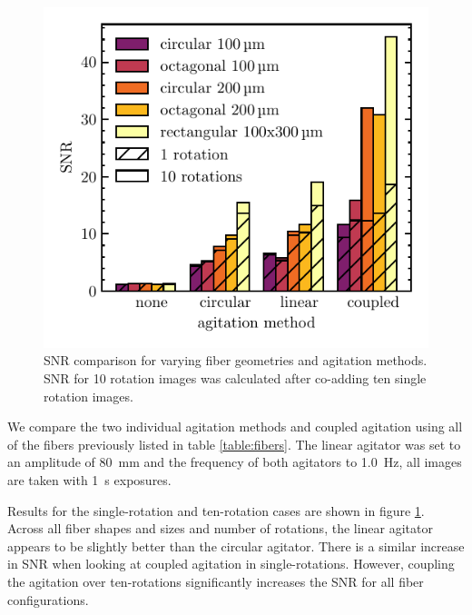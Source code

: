 \documentclass[twocolumn]{emulateapj}
\begin{document}
\begin{figure}
\centering
	\includegraphics[width=\columnwidth]{images/ag_snr.pdf}
	\caption{SNR comparison for varying fiber geometries and agitation methods. SNR for 10 rotation images was calculated after co-adding ten single rotation images.}
\label{fig:ag_snr}
\end{figure}

We compare the two individual agitation methods and coupled agitation using all of the fibers previously listed in table \ref{table:fibers}. The linear agitator was set to an amplitude of \SI{80}{\milli\meter} and the frequency of both agitators to \SI{1.0}{\hertz}, all images are taken with \SI{1}{\second} exposures.

Results for the single-rotation and ten-rotation cases are shown in figure \ref{fig:ag_snr}. Across all fiber shapes and sizes and number of rotations, the linear agitator appears to be slightly better than the circular agitator. There is a similar increase in SNR when looking at coupled agitation in single-rotations. However, coupling the agitation over ten-rotations significantly increases the SNR for all fiber configurations.
\end{document}
